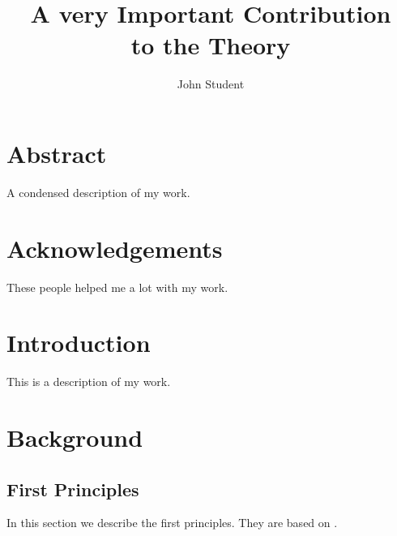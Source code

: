 \documentclass{LTHthesis}
\begin{document}
\begin{titlepages}
\author{John Student}
\title{A very Important Contribution\\ to the Theory}
\end{titlepages}
\chapter*{Abstract}
A condensed description of my work.
\chapter*{Acknowledgements}
These people helped me a lot with my work.
\tableofcontents
\chapter{Introduction}
This is a description of my work.
\chapter{Background}
\section{First Principles}
In this section we describe the first principles. They are based on \cite{ast_wit2011}.

\printbibliography  %
\end{document}
